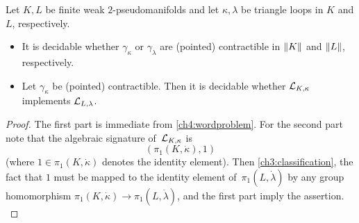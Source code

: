 \begin{thCorollary}
    \label{ch4:latonpmfd}
    Let $K,L$ be finite weak $2$-pseudomanifolds and let $\kappa,\lambda$
    be triangle loops in $K$ and $L$, respectively.
    \begin{itemize}
        \item 
            It is decidable whether $\gamma_\kappa$ or $\gamma_\lambda$
            are (pointed) contractible in $\lVert K\rVert$ and $\lVert L\rVert$,
            respectively.
            
        \item
            Let $\gamma_\kappa$ be (pointed) contractible. Then
            it is decidable whether $\mathcal{L}_{K,\kappa}$ implements $\mathcal{L}_{L,\lambda}$.
    \end{itemize}
\end{thCorollary}

\begin{proof}
    The first part is immediate from \cref{ch4:wordproblem}. For the second
    part note that the algebraic signature of~$\mathcal{L}_{K,\kappa}$ is
    \[ (\pi_1(K,\dot\kappa), 1) \]
    (where $1\in\pi_1(K,\dot\kappa)$ denotes the identity element).
    Then \cref{ch3:classification}, the fact that $1$ must be mapped to the
    identity element of~$\pi_1(L,\dot\lambda)$ by any group homomorphism
    $\pi_1(K,\dot\kappa)\to\pi_1(L,\dot\lambda)$, and the first part imply
    the assertion.
    \\
\end{proof}

